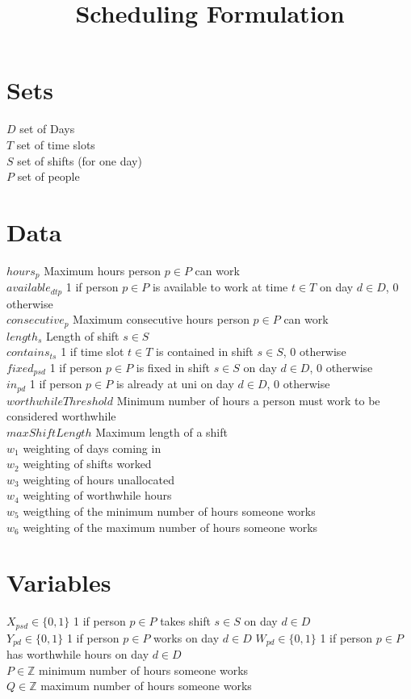 \documentclass{article}
\title{Scheduling Formulation}
\begin{document}
\maketitle
\newpage

\section*{Sets}
$D$ set of Days \\
$T$ set of time slots \\
$S$ set of shifts (for one day) \\
$P$ set of people

\section*{Data}
$hours_p$ Maximum hours person $p \in P$ can work \\
$available_{dtp}$ 1 if person $p \in P$ is available to work at time $t \in T$ on day $d \in D$, 0 otherwise \\
$consecutive_p$ Maximum consecutive hours person $p \in P$ can work \\
$length_s$ Length of shift $s \in S$ \\
$contains_{ts}$ 1  if time slot $t \in T$ is contained in shift $s \in S$, 0 otherwise \\
$fixed_{psd}$ 1 if person $p \in P$ is fixed in shift $s \in S$ on day $d \in D$, 0 otherwise \\
$in_{pd}$ 1 if person $p \in P$ is already at uni on day $d \in D$, 0 otherwise \\ 
$worthwhileThreshold$ Minimum number of hours a person must work to be considered worthwhile \\
$maxShiftLength$ Maximum length of a shift \\
$w_1$ weighting of days coming in \\
$w_2$ weighting of shifts worked \\
$w_3$ weighting of hours unallocated \\
$w_4$ weighting of worthwhile hours \\
$w_5$ weigthing of the minimum number of hours someone works \\
$w_6$ weighting of the maximum number of hours someone works \\


\section*{Variables}
$X_{psd} \in \{0, 1\}$ 1 if person $p \in P$ takes shift $s \in S$ on day $d \in D$ \\
$Y_{pd} \in \{0, 1\}$ 1 if person $p \in P$ works on day $d \in D$
$W_{pd} \in \{0, 1\}$ 1 if person $p \in P$ has worthwhile hours on day $d \in D$ \\
$P \in \mathbb{Z}$ minimum number of hours someone works \\
$Q \in \mathbb{Z}$ maximum number of hours someone works \\
\end{document}
